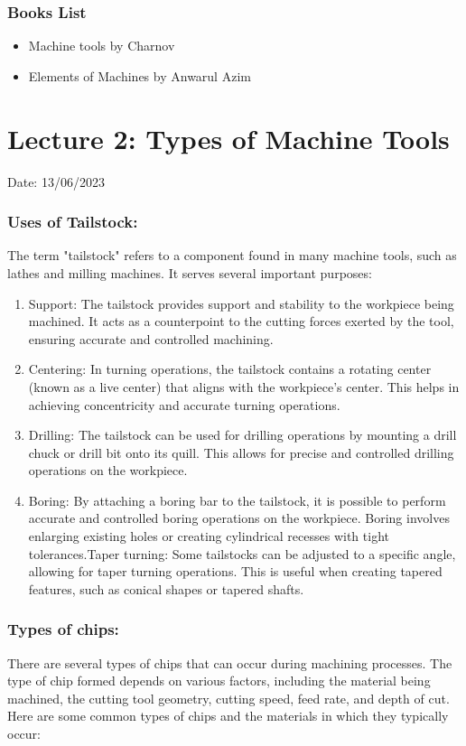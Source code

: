 \documentclass{article}
\begin{document}
\subsubsection*{Books List}
\begin{itemize}
  \item Machine tools \hfill by Charnov
  \item Elements of Machines \hfill by Anwarul Azim 
\end{itemize}
\newpage

\section{Lecture 2: Types of Machine Tools}
\hfill Date: 13/06/2023
\subsubsection*{Uses of Tailstock:}
The term "tailstock" refers to a component found in many machine tools, such as lathes and milling machines. It serves several important purposes:
\begin{enumerate}
  \item Support: The tailstock provides support and stability to the workpiece being machined. It acts as a counterpoint to the cutting forces exerted by the tool, ensuring accurate and controlled machining.
  \item Centering: In turning operations, the tailstock contains a rotating center (known as a live center) that aligns with the workpiece's center. This helps in achieving concentricity and accurate turning operations.
  \item Drilling: The tailstock can be used for drilling operations by mounting a drill chuck or drill bit onto its quill. This allows for precise and controlled drilling operations on the workpiece.
  \item Boring: By attaching a boring bar to the tailstock, it is possible to perform accurate and controlled boring operations on the workpiece. Boring involves enlarging existing holes or creating cylindrical recesses with tight tolerances.Taper turning: Some tailstocks can be adjusted to a specific angle, allowing for taper turning operations. This is useful when creating tapered features, such as conical shapes or tapered shafts.
\end{enumerate}

\subsubsection*{Types of chips:}
There are several types of chips that can occur during machining processes. The type of chip formed depends on various factors, including the material being machined, the cutting tool geometry, cutting speed, feed rate, and depth of cut. Here are some common types of chips and the materials in which they typically occur:
\end{document}
